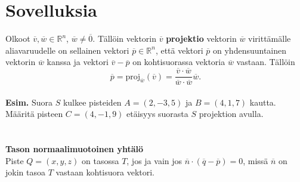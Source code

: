 \documentclass{article}
\begin{document}
\section{Sovelluksia}
Olkoot \(\overline{v}, \overline{w}\in \mathbb{R}^n\), \(\overline{w}\neq \overline{0}\). Tällöin vektorin \(\overline{v}\) \textbf{projektio} vektorin \(\overline{w}\) virittämälle aliavaruudelle on sellainen vektori \(\overline{p}\in \mathbb{R}^n\), että vektori \(\overline{p}\) on yhdensuuntainen vektorin \(\overline{w}\) kanssa ja vektori \(\overline{v}-\overline{p}\) on kohtisuorassa vektoria \(\overline{w}\) vastaan. Tällöin $$\overline{p}=\text{proj}_{\overline{w}} (\overline{v})=\frac{\overline{v}\cdot\overline{w}}{\overline{w}\cdot \overline{w}}\overline{w}.$$
 \\
\textbf{Esim.} Suora \(S\) kulkee pisteiden \(A=(2, -3, 5)\) ja \(B=(4, 1, 7)\) kautta. Määritä pisteen \(C = (4, -1, 9)\) etäisyys suorasta \(S\) projektion avulla.\\
 \\
 \\
\textbf{Tason normaalimuotoinen yhtälö}\\
Piste \(Q=(x, y, z)\) on tasossa \(T\), jos ja vain jos \(\overline{n}\cdot (\overline{q}-\overline{p})=0\), missä \(\overline{n}\) on jokin tasoa \(T\) vastaan kohtisuora vektori.
\end{document}
